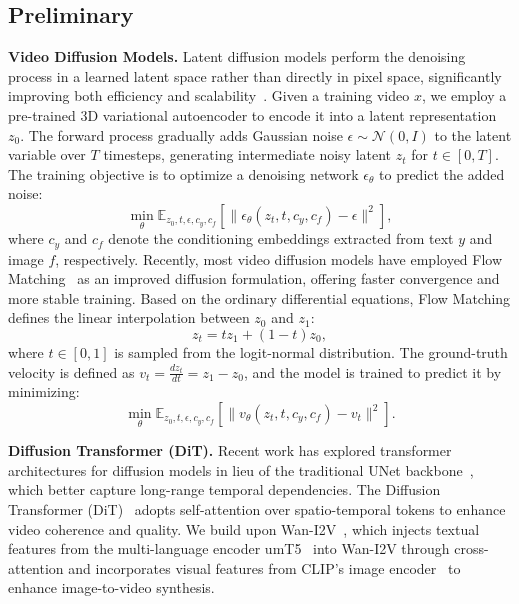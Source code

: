 \subsection{Preliminary}
\label{sec:perliminary}
\textbf{Video Diffusion Models.}
Latent diffusion models perform the denoising process in a learned latent space rather than directly in pixel space, significantly improving both efficiency and scalability~\cite{rombach2022high}. 
Given a training video $x$, we employ a pre-trained 3D variational autoencoder to encode it into a latent representation $z_0$. 
The forward process gradually adds Gaussian noise $\epsilon \sim \mathcal{N}(0, I)$ to the latent variable over $T$ timesteps, generating intermediate noisy latent $z_t$ for $t \in [0, T]$. 
The training objective is to optimize a denoising network $\epsilon_{\theta}$ to predict the added noise:
\begin{equation}
\label{eq:diffusion}
\min_\theta \mathbb{E}_{z_0, t, \epsilon, c_{y}, c_{f}}
\left[\|\epsilon_\theta(z_t, t, c_{y}, c_{f}) - \epsilon\|^2\right],
\end{equation}
where $c_{y}$ and $c_{f}$ denote the conditioning embeddings extracted from text $y$ and image $f$, respectively.
Recently, most video diffusion models have employed Flow Matching~\cite{lipman2022flow} as an improved diffusion formulation, offering faster convergence and more stable training. 
Based on the ordinary differential equations, Flow Matching defines the linear interpolation between $z_0$ and $z_1$:
\begin{equation}
z_t = t z_1 + (1 - t) z_0,
\end{equation}
where $t\in[0,1]$ is sampled from the logit-normal distribution.
The ground-truth velocity is defined as $v_t = \frac{dz_t}{dt} = z_1 - z_0$, and the model is trained to predict it by minimizing: 
\begin{equation}
\label{eq:flow_matching}
\min_\theta \mathbb{E}_{z_0, t, \epsilon, c_y, c_f}
\left[\|v_\theta(z_t, t, c_y, c_f) - v_t\|^2\right].
\end{equation}


\noindent\textbf{Diffusion Transformer (DiT).}
Recent work has explored transformer architectures for diffusion models in lieu of the traditional UNet backbone~\cite{ronneberger2015u}, which better capture long-range temporal dependencies. The Diffusion Transformer (DiT)~\cite{peebles2023scalable} adopts self-attention over spatio-temporal tokens to enhance video coherence and quality. We build upon Wan-I2V~\cite{wang2025wan}, which injects textual features from the multi-language encoder umT5~\cite{chung2023unimax} into Wan-I2V through cross-attention and incorporates visual features from CLIP’s image encoder~\cite{radford2021learning} to enhance image-to-video synthesis.

